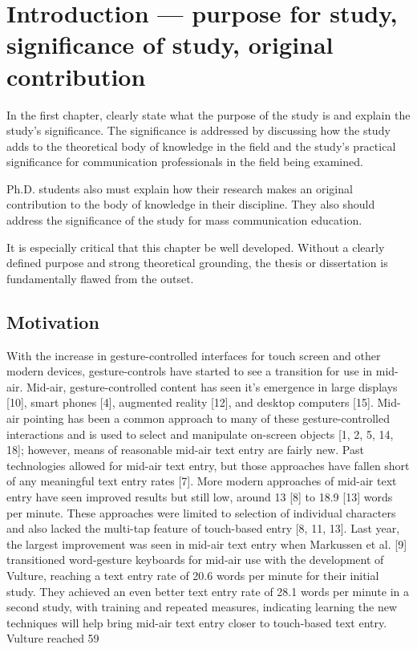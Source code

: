 \chapter{Introduction --- purpose for study, significance of study, original contribution}

In the first chapter, clearly state what the purpose of the study is and explain the study's significance. The
significance is addressed by discussing how the study adds to the theoretical body of knowledge in the field and the
study's practical significance for communication professionals in the field being examined.

Ph.D. students also must explain how their research makes an original contribution to the body of
knowledge in their discipline. They also should address the significance of the study for mass communication
education.

It is especially critical that this chapter be well developed. Without a clearly defined purpose and strong
theoretical grounding, the thesis or dissertation is fundamentally flawed from the outset. 

\section{Motivation}

With the increase in gesture-controlled interfaces for touch screen and other modern devices, gesture-controls have started to see a transition for use in mid-air. Mid-air, gesture-controlled content has seen it's emergence in large displays [10], smart phones [4], augmented reality [12], and desktop computers [15]. Mid-air pointing has been a common approach to many of these gesture-controlled interactions and is used to select and manipulate on-screen objects [1, 2, 5, 14, 18]; however, means of reasonable mid-air text entry are fairly new. Past technologies allowed for mid-air text entry, but those approaches have fallen short of any meaningful text entry rates [7]. More modern approaches of mid-air text entry have seen improved results but still low, around 13 [8] to 18.9 [13] words per minute. These approaches were limited to selection of individual characters and also lacked the multi-tap feature of touch-based entry [8, 11, 13]. Last year, the largest improvement was seen in mid-air text entry when Markussen et al. [9] transitioned word-gesture keyboards for mid-air use with the development of Vulture, reaching a text entry rate of 20.6 words per minute for their initial study. They achieved an even better text entry rate of 28.1 words per minute in a second study, with training and repeated measures, indicating learning the new techniques will help bring mid-air text entry closer to touch-based text entry. Vulture reached 59%

